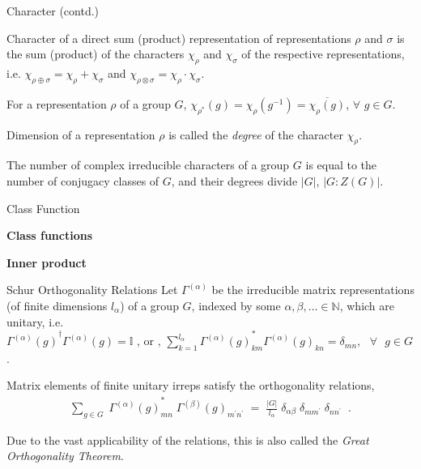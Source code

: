 \documentclass{beamer}
\newcommand\boldtext[1]{\textcolor{bolds}{\textbf{#1}}}
\newcommand\italictext[1]{\textcolor{italics}{\textit{#1}}}
\begin{document}
\begin{frame}{Character (contd.)}
    \begin{theorem}
        Character of a direct sum (product) representation of representations $\rho$ and $\sigma$ is the sum (product) of the characters $\chi_\rho$ and $\chi_\sigma$ of the respective representations, i.e. $\chi_{\rho\oplus\sigma}=\chi_\rho+\chi_\sigma$ and $\chi_{\rho\otimes\sigma}=\chi_\rho\cdot\chi_\sigma$.
    \end{theorem}
    \begin{theorem}
        For a representation $\rho$ of a group $G$, $\chi_{\rho^*}(g)=\chi_{\rho}(g^{-1})=\overline{\chi_{\rho}(g)}$, $\forall$ $g\in G$.
    \end{theorem}
    Dimension of a representation $\rho$ is called the \italictext{degree} of the character $\chi_\rho$.
    \begin{theorem}
         The number of complex irreducible characters of a group $G$ is equal to the number of conjugacy classes of $G$, and their degrees divide $\lvert G\rvert$, $\lvert G:Z(G)\rvert$.
    \end{theorem}
\end{frame}

\begin{frame}{Class Function}
    \begin{definition}
        \boldtext{Class functions}
    \end{definition}
    \begin{definition}
        \boldtext{Inner product}
    \end{definition}
\end{frame}

\begin{frame}{Schur Orthogonality Relations}
    Let $\Gamma^{(\alpha)}$ be the irreducible matrix representations (of finite dimensions ${l_\alpha}$) of a group $G$, indexed by some $\alpha,\beta,\dotsc\in\mathbb{N}$, which are unitary, i.e. ${\Gamma^{(\alpha)}(g)}^{\dagger}\Gamma^{(\alpha)}(g)=\mathbb{I}\text{ ,  or , }\sum\limits_{k=1}^{l_\alpha}{\Gamma^{(\alpha)}(g)}_{km}^*\Gamma^{(\alpha)}(g)_{kn}=\delta_{mn},\text{ }\forall\text{ }g\in G$ .
    \begin{theorem}
        Matrix elements of finite unitary irreps satisfy the orthogonality relations,
        \vspace{-0.75em}
        \begin{align*}
            \sum\limits_{g\in G}\;{\Gamma^{(\alpha)}(g)}_{mn}^*\;\Gamma^{(\beta)}(g)_{m^\prime n^\prime}\;=\;\frac{\lvert G\rvert}{l_\alpha}\; \delta_{\alpha\beta}\;\delta_{mm^\prime}\;\delta_{nn^\prime}\;\;. 
        \end{align*}
    \end{theorem}
    Due to the vast applicability of the relations, this is also called the \italictext{Great Orthogonality Theorem}.
\end{frame}
\end{document}
